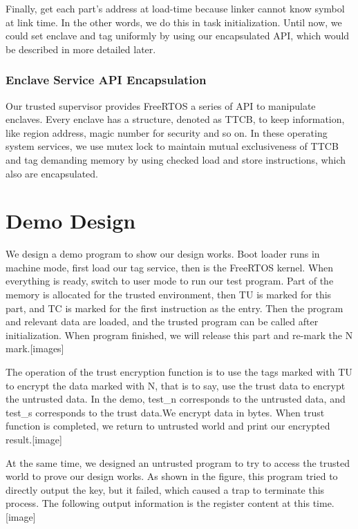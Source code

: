 \documentclass[conference]{IEEEtran}
\begin{document}
Finally, get each part's address at load-time because linker cannot know symbol at link time. In the other words, we do this in task initialization. Until now, we could set enclave and tag uniformly by using our encapsulated API, which would be described in more detailed later.

\subsubsection{Enclave Service API Encapsulation}

Our trusted supervisor provides FreeRTOS a series of API to manipulate enclaves. Every enclave has a structure, denoted as TTCB, to keep information, like region address, magic number for security and so on. In these operating system services, we use mutex lock to maintain mutual exclusiveness of TTCB and tag demanding memory by using checked load and store instructions, which also are encapsulated.

\section{Demo Design}
We design a demo program to show our design works. Boot loader runs in machine mode, first load our tag service, then is the FreeRTOS kernel. When everything is ready, switch to user mode to run our test program. Part of the memory is allocated for the trusted environment, then TU is marked for this part, and TC is marked for the first instruction as the entry. Then the program and relevant data are loaded, and the trusted program can be called after initialization. When program finished, we will release this part and re-mark the N mark.[images]

The operation of the trust encryption function is to use the tags marked with TU to encrypt the data marked with N, that is to say, use the trust data to encrypt the untrusted data. In the demo, test\_n corresponds to the untrusted data, and test\_s corresponds to the trust data.We encrypt data in bytes. When  trust function is completed, we return to untrusted world and print our encrypted result.[image]

At the same time, we designed an untrusted program to try to access the trusted world to prove our design works. As shown in the figure, this program tried to directly output the key, but it failed, which caused a trap to terminate this process. The following output information is the register content at this time.[image]
\end{document}
